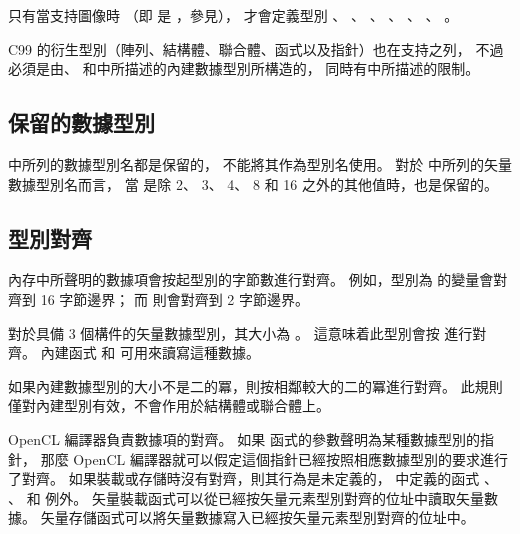 只有當支持圖像時
（即  是 ，參見），
才會定義型別 、 、 、
 、 、 、
 。

C99 的衍生型別（陣列、結構體、聯合體、函式以及指針）也在支持之列，
不過必須是由、
和中所描述的內建數據型別所構造的，
同時有中所描述的限制。

\subsection{保留的數據型別}

 中所列的數據型別名都是保留的，
不能將其作為型別名使用。
對於 中所列的矢量數據型別名而言，
當  是除 2、 3、 4、 8 和 16 之外的其他值時，也是保留的。


\subsection[sec:alignmentOfTypes]{型別對齊}

內存中所聲明的數據項會按起型別的字節數進行對齊。
例如，型別為  的變量會對齊到 16 字節邊界；
而  則會對齊到 2 字節邊界。

對於具備 3 個構件的矢量數據型別，其大小為 。
這意味着此型別會按  進行對齊。
內建函式  和  可用來讀寫這種數據。

如果內建數據型別的大小不是二的冪，則按相鄰較大的二的冪進行對齊。
此規則僅對內建型別有效，不會作用於結構體或聯合體上。

OpenCL 編譯器負責數據項的對齊。
如果  函式的參數聲明為某種數據型別的指針，
那麼 OpenCL 編譯器就可以假定這個指針已經按照相應數據型別的要求進行了對齊。
如果裝載或存儲時沒有對齊，則其行為是未定義的，
中定義的函式 、 、
  和  例外。
矢量裝載函式可以從已經按矢量元素型別對齊的位址中讀取矢量數據。
矢量存儲函式可以將矢量數據寫入已經按矢量元素型別對齊的位址中。

